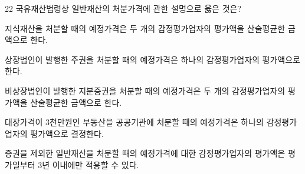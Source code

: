 \begin{question}{22}
국유재산법령상 일반재산의 처분가격에 관한 설명으로 옳은 것은?
\begin{choices}
  \item 지식재산을 처분할 때의 예정가격은 두 개의 감정평가업자의 평가액을 산술평균한 금액으로 한다.
  \item 상장법인이 발행한 주권을 처분할 때의 예정가격은 하나의 감정평가업자의 평가액으로 한다.
  \item 비상장법인이 발행한 지분증권을 처분할 때의 예정가격은 두 개의 감정평가업자의 평가액을 산술평균한 금액으로 한다.
  \item 대장가격이 3천만원인 부동산을 공공기관에 처분할 때의 예정가격은 하나의 감정평가업자의 평가액으로 결정한다.
  \item 증권을 제외한 일반재산을 처분할 때의 예정가격에 대한 감정평가업자의 평가액은 평가일부터 3년 이내에만 적용할 수 있다.
\end{choices}
\end{question}
